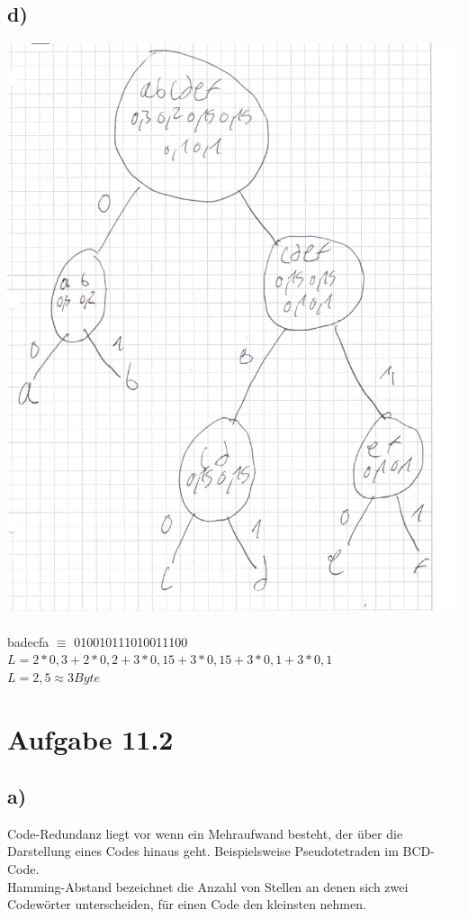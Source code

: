 \documentclass{article}
\begin{document}
	\subsection*{d)}
	\includegraphics[width=\linewidth]{111d} \\ \\
	badecfa $\equiv$ 010010111010011100 \\
	$L = 2*0,3 + 2*0,2 + 3*0,15 + 3*0,15 + 3*0,1 + 3*0,1$ \\
	$L = 2,5 \approx 3 Byte$
	\section*{Aufgabe 11.2}
	\subsection*{a)}
	Code-Redundanz liegt vor wenn ein Mehraufwand besteht, der über die Darstellung eines Codes hinaus geht. Beispielsweise Pseudotetraden im BCD-Code. \\
	Hamming-Abstand bezeichnet die Anzahl von Stellen an denen sich zwei Codewörter unterscheiden, für einen Code den kleinsten nehmen.
\end{document}
